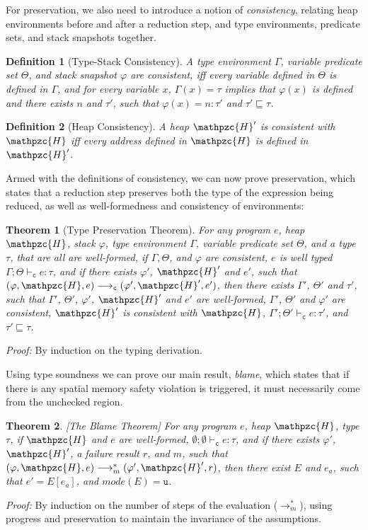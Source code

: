 \documentclass[conference]{IEEEtran}
\newtheorem{defi}{Definition}
\newtheorem{thm}{Theorem}
\newcommand{\checkedc}{\text{Checked C}\xspace}
\newcommand{\evalue}[2]{\ensuremath{{#1}\!:\!{#2}}}
\newcommand{\heap}{\ensuremath{\mathpzc{H}}}
\newcommand{\cmode}{\texttt{c}}
\newcommand{\umode}{\texttt{u}}
\newcommand{\mode}{\textit{mode}}
\begin{document}
For preservation, we also need to introduce a notion of
\emph{consistency}, relating heap environments before and after a
reduction step, and type environments, predicate sets, and stack
snapshots together.

\smallskip
\begin{defi}[Type-Stack Consistency]
A type environment $\Gamma$, variable predicate set $\Theta$, and stack snapshot $\varphi$ are consistent, iff every variable defined in $\Theta$ is defined in $\Gamma$, and for every variable $x$, $\Gamma(x) = \tau$ implies that $\varphi(x)$ is defined and there exists $n$ and $\tau'$, such that $\varphi(x)=\evalue{n}{\tau'}$ and $\tau' \sqsubseteq \tau$.
\end{defi}
\smallskip
\begin{defi}[Heap Consistency]
A heap $\heap'$ is consistent with $\heap$ iff every address defined
in $\heap$ is defined in $\heap'$.
\end{defi}
\smallskip

\noindent
Armed with the definitions of consistency, we can now prove
preservation, which states that a reduction step preserves both the
type of the expression being reduced, as well as well-formedness and
consistency of environments:

\smallskip
\begin{thm}[Type Preservation Theorem]
For any \checkedc program $e$, heap $\heap$, stack
$\varphi$, type environment $\Gamma$, variable predicate set $\Theta$,
and a type $\tau$, that are all are well-formed, if $\Gamma, \Theta$,
and $\varphi$ are consistent, $e$ is well typed
$\Gamma;\Theta\vdash_{\cmode} e : \tau$, and if there exists $\varphi'$,
$\heap'$ and $e'$, such that $(\varphi,\heap,e)
\longrightarrow_{\cmode} (\varphi',\heap',e')$, then there exists
$\Gamma'$, $\Theta'$ and $\tau'$, such that $\Gamma'$, $\Theta'$,
$\varphi'$, $\heap'$ and $e'$ are well-formed, $\Gamma'$, $\Theta'$
and $\varphi'$ are consistent, $\heap'$ is consistent with $\heap$,
$\Gamma';\Theta' \vdash_{\cmode} e: \tau'$, and $\tau'\sqsubseteq
\tau$.
\end{thm}
{\em Proof:} By induction on the typing derivation.
\smallskip

Using type soundness we can prove our main result, {\em blame}, which
states that if there is any spatial memory safety violation is
triggered, it must necessarily come from the unchecked region. 

\smallskip
\begin{thm}\label{thm:blame}
[The Blame Theorem] For any \checkedc program $e$, heap
$\heap$, type $\tau$, if $\heap$ and $e$ are well-formed,
$\emptyset;\emptyset\vdash_{\cmode} e : \tau$, and if there exists
$\varphi'$, $\heap'$, a failure result $r$, and $m$, such that
$(\varphi,\heap,e) \longrightarrow_m^* (\varphi',\heap',r)$, then
there exist $E$ and $e_a$, such that $e' = E[e_a]$, and $\mode(E) = \umode$.
\end{thm}
{\em Proof:} By induction on the number of steps of the \checkedc
evaluation ($\longrightarrow_m^*$), using progress and preservation to
maintain the invariance of the assumptions.
\end{document}
